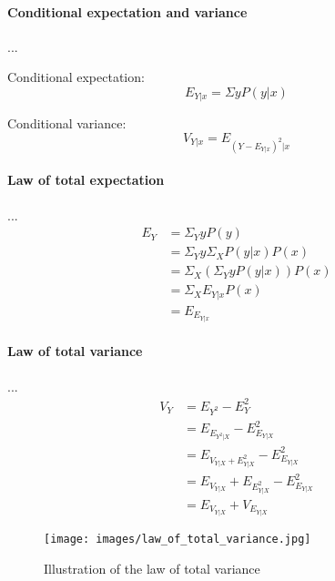 \paragraph{Conditional expectation and variance} ...

\begin{definition} \label{conditionalExpectation}
    Conditional expectation:
    $$ E_{Y|x} = \Sigma y P(y|x) $$
\end{definition}

\begin{definition} \label{conditionalVariance}
    Conditional variance: 
    $$ V_{Y|x} = E_{(Y - E_{Y|x})^2 | x} $$ 
\end{definition}

\paragraph{Law of total expectation} ...
\begin{equation} \label{lawOfTotalExpectation}
    \begin{aligned}
        E_Y &= \Sigma_Y y P(y) \\
            &= \Sigma_Y y \Sigma_X P(y|x) P(x) \\
            &= \Sigma_X (\Sigma_Y y P(y|x)) P(x) \\
            &= \Sigma_X E_{Y|x} P(x) \\
            &= E_{E_{Y|x}}
    \end{aligned}
\end{equation}

\paragraph{Law of total variance} ...
\begin{equation} \label{lawOfTotalVariance}
    \begin{aligned}
        V_Y &= E_{Y^2} - E_Y^2 \\
            &= E_{E_{Y^2 | X}} - E^2_{E_{Y|X}} \\
            &= E_{  V_{Y|X} + E^2_{Y|X}  } - E^2_{E_{Y|X}} \\
            &= E_{V_{Y|X}} + E_{E^2_{Y|X}} - E^2_{E_{Y|X}} \\
            &= E_{V_{Y|X}} + V_{E_{Y|X}}
    \end{aligned}
\end{equation}


\begin{figure}[h]
    \caption{Illustration of the law of total variance}
    \centering
      \texttt{[image: images/law\_of\_total\_variance.jpg]}
\end{figure}
 
